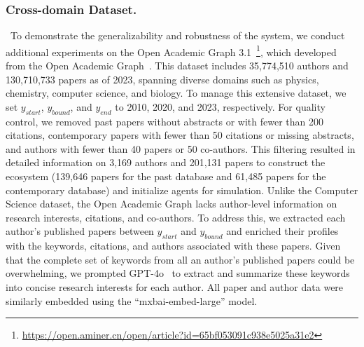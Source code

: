 \documentclass[11pt]{article}
\begin{document}
{\subsubsection{Cross-domain Dataset.}~To demonstrate the generalizability and robustness of the system, we conduct additional experiments on the Open Academic Graph 3.1~\footnote{\url{https://open.aminer.cn/open/article?id=65bf053091c938e5025a31e2}}, which developed from the Open Academic Graph~\citep{zhang2022oag}.
This dataset includes 35,774,510 authors and 130,710,733 papers as of 2023, spanning diverse domains such as physics, chemistry, computer science, and biology. To manage this extensive dataset, we set $y_{start}$, $y_{bound}$, and $y_{end}$ to 2010, 2020, and 2023, respectively.
For quality control, we removed past papers without abstracts or with fewer than 200 citations, contemporary papers with fewer than 50 citations or missing abstracts, and authors with fewer than 40 papers or 50 co-authors. This filtering resulted in detailed information on 3,169 authors and 201,131 papers to construct the ecosystem (139,646 papers for the past database and 61,485 papers for the contemporary database) and initialize agents for simulation.
Unlike the Computer Science dataset, the Open Academic Graph lacks author-level information on research interests, citations, and co-authors. To address this, we extracted each author’s published papers between $y_{start}$ and $y_{bound}$ and enriched their profiles with the keywords, citations, and authors associated with these papers. Given that the complete set of keywords from all an author’s published papers could be overwhelming, we prompted GPT-4o~\citep{openai} to extract and summarize these keywords into concise research interests for each author. All paper and author data were similarly embedded using the “mxbai-embed-large” model.}
\end{document}
